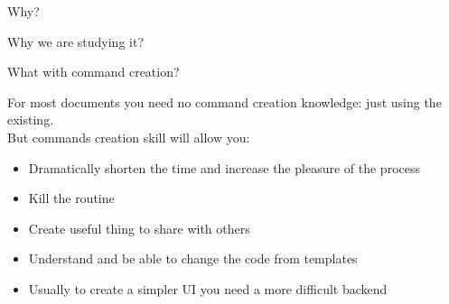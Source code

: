 \graphicspath{{sec01/images/}{sec01/code/}}
\lstset{inputpath=sec01/code/}

\begin{frame}{Why?}

\Huge\centering Why we are studying it?
     
\end{frame}

\begin{frame}{What with command creation?}\relax

For most documents you need no command creation knowledge: just using the existing.\\[3ex]
But commands creation skill will allow you:
\begin{itemize}
    \item Dramatically shorten the time and increase the pleasure of the process
    \item Kill the routine
    \item Create useful thing to share with others
    \item Understand and be able to change the code from templates 
    \item Usually to create a simpler UI you need a more difficult backend
     
\end{itemize}
     
\end{frame}